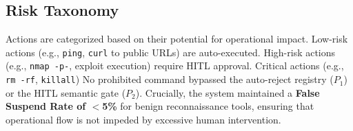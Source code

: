 \subsection{Risk Taxonomy}
Actions are categorized based on their potential for operational impact. Low-risk actions (e.g., \texttt{ping}, \texttt{curl} to public URLs) are auto-executed. High-risk actions (e.g., \texttt{nmap -p-}, exploit execution) require HITL approval. Critical actions (e.g., \texttt{rm -rf}, \texttt{killall}) No prohibited command bypassed the auto-reject registry ($P_1$) or the HITL semantic gate ($P_2$). Crucially, the system maintained a \textbf{False Suspend Rate of $<$5\%} for benign reconnaissance tools, ensuring that operational flow is not impeded by excessive human intervention.
